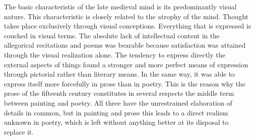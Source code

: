 The basic characteristic of the late medieval mind is its predominantly
visual nature. This characteristic is closely related to the atrophy of
the mind. Thought takes place exclusively through visual conceptions.
Everything that is expressed is couched in visual terms. The absolute
lack of intellectual content in the allegorical recitations and poems
was bearable because satisfaction was attained through the visual
realization alone. The tendency to express directly the external aspects
of things found a stronger and more perfect means of expression through
pictorial rather than literary means. In the same way, it was able to
express itself more forcefully in prose than in poetry. This is the
reason why the prose of the fifteenth century constitutes in several
respects the middle term between painting and poetry. All three have the
unrestrained elaboration of details in common, but in painting and prose
this leads to a direct realism unknown in poetry, which is left without
anything better at its disposal to replace it.

